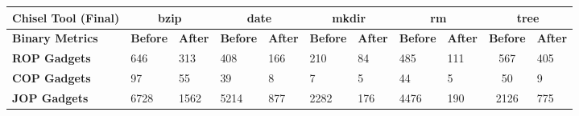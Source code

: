 \documentclass{relatorio}
\begin{document}
\begin{table}[]
	\centering
	\begin{tabular}{l|ll|ll|ll|ll|cl}
		\hline
		{\color[HTML]{3531FF} \textbf{Chisel Tool (Final)}}                                              & \multicolumn{2}{c|}{{\color[HTML]{000000} \textbf{bzip}}}                      & \multicolumn{2}{c|}{{\color[HTML]{000000} \textbf{date}}}                      & \multicolumn{2}{c|}{{\color[HTML]{000000} \textbf{mkdir}}}                     & \multicolumn{2}{c|}{{\color[HTML]{000000} \textbf{rm}}}                        & \multicolumn{2}{c}{{\color[HTML]{000000} \textbf{tree}}}                                           \\ \hline
		\textbf{Binary Metrics}                                                                          & {\color[HTML]{CB0000} \textbf{Before}} & {\color[HTML]{009901} \textbf{After}} & {\color[HTML]{CB0000} \textbf{Before}} & {\color[HTML]{009901} \textbf{After}} & {\color[HTML]{CB0000} \textbf{Before}} & {\color[HTML]{009901} \textbf{After}} & {\color[HTML]{CB0000} \textbf{Before}} & {\color[HTML]{009901} \textbf{After}} & \multicolumn{1}{l}{{\color[HTML]{CB0000} \textbf{Before}}} & {\color[HTML]{009901} \textbf{After}} \\ \hline
		\textbf{ROP Gadgets}                                                                             & 646                                    & 313                                   & 408                                    & 166                                   & 210                                    & 84                                    & 485                                    & 111                                   & 567                                                        & 405                                   \\
		\textbf{COP Gadgets}                                                                             & 97                                     & 55                                    & 39                                     & 8                                     & 7                                      & 5                                     & 44                                     & 5                                     & 50                                                         & 9                                     \\
		\textbf{JOP Gadgets}                                                                             & 6728                                   & 1562                                  & 5214                                   & 877                                   & 2282                                   & 176                                   & 4476                                   & 190                                   & 2126                                                       & 775                                   \\

\end{tabular}
\end{table}
\end{document}
